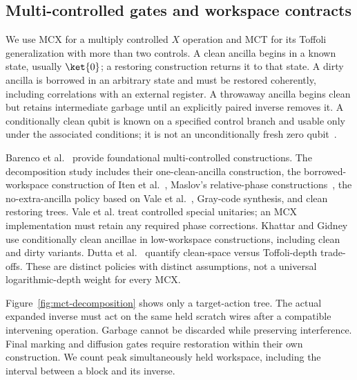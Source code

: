 \documentclass[sigconf, natbib]{acmart}
\begin{document}
\subsection{Multi-controlled gates and workspace contracts}
\label{subsec:workspace}
We use MCX for a multiply controlled $X$ operation and MCT for its Toffoli generalization with more than two controls. A clean ancilla begins in a known state, usually $\ket{0}$; a restoring construction returns it to that state. A dirty ancilla is borrowed in an arbitrary state and must be restored coherently, including correlations with an external register. A throwaway ancilla begins clean but retains intermediate garbage until an explicitly paired inverse removes it. A conditionally clean qubit is known on a specified control branch and usable only under the associated conditions; it is not an unconditionally fresh zero qubit~\cite{KhattarGidney2025}.

Barenco et al.~\cite{Barenco1995} provide foundational multi-controlled constructions. The decomposition study includes their one-clean-ancilla construction, the borrowed-workspace construction of Iten et al.~\cite{Iten2016}, Maslov's relative-phase constructions~\cite{Maslov2016}, the no-extra-ancilla policy based on Vale et al.~\cite{Vale2024}, Gray-code synthesis, and clean restoring trees. Vale et al. treat controlled special unitaries; an MCX implementation must retain any required phase corrections. Khattar and Gidney~\cite{KhattarGidney2025} use conditionally clean ancillae in low-workspace constructions, including clean and dirty variants. Dutta et al.~\cite{toffoli_decomposition} quantify clean-space versus Toffoli-depth trade-offs. These are distinct policies with distinct assumptions, not a universal logarithmic-depth weight for every MCX.

Figure~\ref{fig:mct-decomposition} shows only a target-action tree. The actual expanded inverse must act on the same held scratch wires after a compatible intervening operation. Garbage cannot be discarded while preserving interference. Final marking and diffusion gates require restoration within their own construction. We count peak simultaneously held workspace, including the interval between a block and its inverse.
\end{document}
